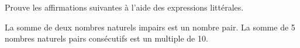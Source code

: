 %
%
Prouve les affirmations suivantes à l'aide des expressions littérales.
    \begin{tasks}
        \task La somme de deux nombres naturels impairs est un nombre pair.
        \task La somme de 5 nombres naturels pairs consécutifs est un multiple de 10.
    \end{tasks}
